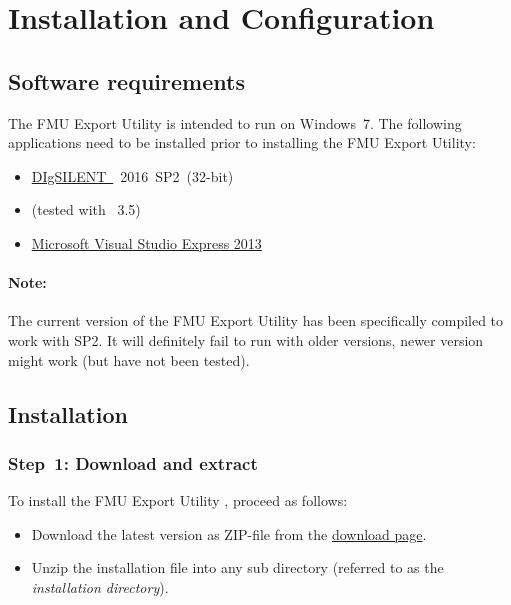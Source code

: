\chapter{Installation and Configuration}

\section{Software requirements}

The \fmipp \pf FMU Export Utility is intended to run on Windows~7. The following applications need to be installed prior to installing the \fmipp \pf FMU Export Utility:
\begin{itemize}
  \item \href{http://www.digsilent.com/}{DIgSILENT~\pf}~2016~SP2~(32-bit)
  \item \href{https://www.python.org/}{\python} (tested with \python~3.5)
  \item \href{https://www.microsoft.com/en-us/download/details.aspx?id=44914}{Microsoft Visual Studio Express 2013}
\end{itemize}

\subsubsection*{Note:}
The current version of the \fmipp \pf FMU Export Utility has been specifically compiled to work with  SP2.
It will definitely fail to run with older versions, newer version might work (but have not been tested).


\section{Installation}
\label{sec:install}

\subsection*{Step~1: Download and extract}

To install the \fmipp \pf FMU Export Utility , proceed as follows:
\begin{itemize}
  \item Download the latest version as ZIP-file from the \href{http://sourceforge.net/projects/powerfactory-fmu/files/latest/download}{download page}.
  \item Unzip the installation file into any sub directory (referred to as the \emph{installation directory}).
\end{itemize}

